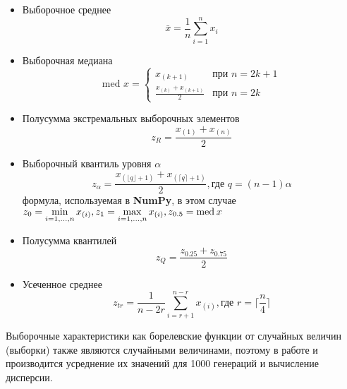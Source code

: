\documentclass[12pt,a4paper]{article}
\begin{document}
\begin{itemize}
	\item Выборочное среднее
	\begin{equation}\label{3}
		\bar x = \frac{1}{n}\sum_{i=1}^{n}{x_i}
	\end{equation}
	
	\item Выборочная медиана
	\begin{equation}\label{4}
		\text{med }x = 
		\begin{cases}
			x_{(k+1)} &\text{при $n=2k+1$}\\
			\frac{x_{(k)} + x_{(k+1)}}{2} &\text{при $n=2k$}
		\end{cases}
	\end{equation}
	
	\item Полусумма экстремальных выборочных элементов
	\begin{equation}\label{5}
		z_R = \frac{x_{(1)} + x_{(n)}}{2}
	\end{equation}
	
	\item Выборочный квантиль уровня $\alpha$
	\begin{equation}
		z_{\alpha} = \frac{x_{(\lfloor q \rfloor+1)} +
							x_{(\lceil q \rceil+1)}}{2}, \text{где } q=(n-1)\alpha
	\end{equation}
	формула, используемая в \textbf{NumPy}, в этом случае $z_0 = \min\limits_{i=1,...,n}x_{(i)}, z_1 = \max\limits_{i=1,...,n}x_{(i)},
	\newline z_{0.5} = \text{med} \hspace{2pt} x$
	
	\item Полусумма квантилей
	\begin{equation}\label{7}
		z_Q = \frac{z_{0.25} + z_{0.75}}{2}
	\end{equation}
	
	\item Усеченное среднее
	\begin{equation}\label{8}
		z_{tr} = \frac{1}{n-2r}\sum_{i=r+1}^{n-r}x_{(i)}, \text{где } r=\lceil \frac{n}{4} \rceil
	\end{equation}
\end{itemize}
	
	Выборочные характеристики как борелевские функции от случайных величин (выборки) также являются случайными величинами, поэтому в работе и производится усреднение их значений для 1000 генераций и вычисление дисперсии.
\end{document}
